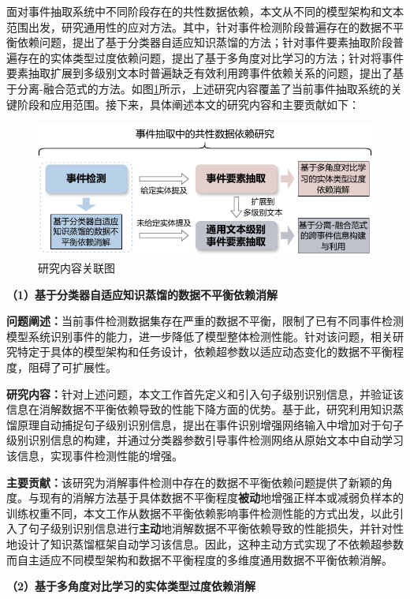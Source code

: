 面对事件抽取系统中不同阶段存在的共性数据依赖，本文从不同的模型架构和文本范围出发，研究通用性的应对方法。其中，针对事件检测阶段普遍存在的数据不平衡依赖问题，提出了基于分类器自适应知识蒸馏的方法；针对事件要素抽取阶段普遍存在的实体类型过度依赖问题，提出了基于多角度对比学习的方法；针对将事件要素抽取扩展到多级别文本时普遍缺乏有效利用跨事件依赖关系的问题，提出了基于分离-融合范式的方法。如图\ref{subtask_relation}所示，上述研究内容覆盖了当前事件抽取系统的关键阶段和应用范围。接下来，具体阐述本文的研究内容和主要贡献如下：

\begin{figure}[htp]
    \centering
   \includegraphics[width=0.8\linewidth]{figures/chap1/subtask-relation.pdf}
   \caption{研究内容关联图}
   \label{subtask_relation}
\end{figure}

\textbf{（1）基于分类器自适应知识蒸馏的数据不平衡依赖消解}

\textbf{问题阐述：}当前事件检测数据集存在严重的数据不平衡，限制了已有不同事件检测模型系统识别事件的能力，进一步降低了模型整体检测性能。针对该问题，相关研究特定于具体的模型架构和任务设计，依赖超参数以适应动态变化的数据不平衡程度，阻碍了可扩展性。

\textbf{研究内容：}针对上述问题，本文工作首先定义和引入句子级别识别信息，并验证该信息在消解数据不平衡依赖导致的性能下降方面的优势。基于此，研究利用知识蒸馏原理自动捕捉句子级别识别信息，提出在事件识别增强网络输入中增加对于句子级别识别信息的构建，并通过分类器参数引导事件检测网络从原始文本中自动学习该信息，实现事件检测性能的增强。

\textbf{主要贡献：}该研究为消解事件检测中存在的数据不平衡依赖问题提供了新颖的角度。与现有的消解方法基于具体数据不平衡程度\textbf{被动}地增强正样本或减弱负样本的训练权重不同，本文工作从数据不平衡依赖影响事件检测性能的方式出发，以此引入了句子级别识别信息进行\textbf{主动}地消解数据不平衡依赖导致的性能损失，并针对性地设计了知识蒸馏框架自动学习该信息。因此，这种主动方式实现了不依赖超参数而自主适应不同模型架构和数据不平衡程度的多维度通用数据不平衡依赖消解。

\textbf{（2）基于多角度对比学习的实体类型过度依赖消解}

